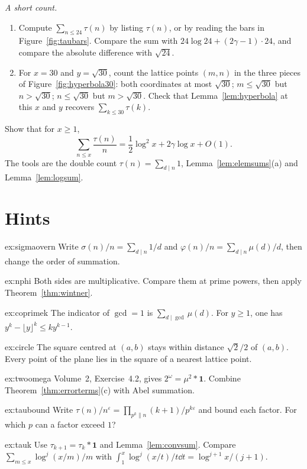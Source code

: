 \begin{exercise}[$\star\star$]\label{ex:avg6c}
\emph{A short count.}
\begin{enumerate}[label=(\alph*)]
\item Compute $\sum_{n\le24}\tau(n)$ by listing $\tau(n)$, or by reading the bars in Figure~\ref{fig:taubars}. Compare the sum with $24\log24+(2\gamma-1)\cdot24$, and compare the absolute difference with $\sqrt{24}$.
\item For $x=30$ and $y=\sqrt{30}$, count the lattice points $(m,n)$ in the three pieces of Figure~\ref{fig:hyperbola30}: both coordinates at most $\sqrt{30}$; $m\le\sqrt{30}$ but $n>\sqrt{30}$; $n\le\sqrt{30}$ but $m>\sqrt{30}$. Check that Lemma~\ref{lem:hyperbola} at this $x$ and $y$ recovers $\sum_{k\le30}\tau(k)$.
\end{enumerate}
\end{exercise}

\begin{exercise}[$\star\star\star$]\label{ex:avg6d}
Show that for $x\ge1$,
\[
\sum_{n\le x}\frac{\tau(n)}n=\frac12\log^2 x+2\gamma\log x+O(1).
\]
The tools are the double count $\tau(n)=\sum_{d\mid n}1$, Lemma~\ref{lem:elemsums}(a) and Lemma~\ref{lem:logsum}.
\end{exercise}

\section{Hints}

\begin{hint}{ex:sigmaovern}
Write $\sigma(n)/n=\sum_{d\mid n}1/d$ and $\varphi(n)/n=\sum_{d\mid n}\mu(d)/d$, then change the order of summation.
\end{hint}
\begin{hint}{ex:nphi}
Both sides are multiplicative. Compare them at prime powers, then apply Theorem~\ref{thm:wintner}.
\end{hint}
\begin{hint}{ex:coprimek}
The indicator of $\gcd=1$ is $\sum_{d\mid\gcd}\mu(d)$. For $y\ge1$, one has $y^k-\lfloor y\rfloor^k\le ky^{k-1}$.
\end{hint}
\begin{hint}{ex:circle}
The square centred at $(a,b)$ stays within distance $\sqrt2/2$ of $(a,b)$. Every point of the plane lies in the square of a nearest lattice point.
\end{hint}
\begin{hint}{ex:twoomega}
Volume~2, Exercise~4.2, gives $2^\omega=\mu^2*\mathbf1$. Combine Theorem~\ref{thm:errorterms}(c) with Abel summation.
\end{hint}
\begin{hint}{ex:taubound}
Write $\tau(n)/n^\varepsilon=\prod_{p^k\|n}(k+1)/p^{k\varepsilon}$ and bound each factor. For which $p$ can a factor exceed $1$?
\end{hint}
\begin{hint}{ex:tauk}
Use $\tau_{k+1}=\tau_k*\mathbf1$ and Lemma~\ref{lem:convsum}. Compare $\sum_{m\le x}\log^j(x/m)/m$ with $\int_1^x\log^j(x/t)/t\dd t=\log^{j+1}x/(j+1)$.
\end{hint}

